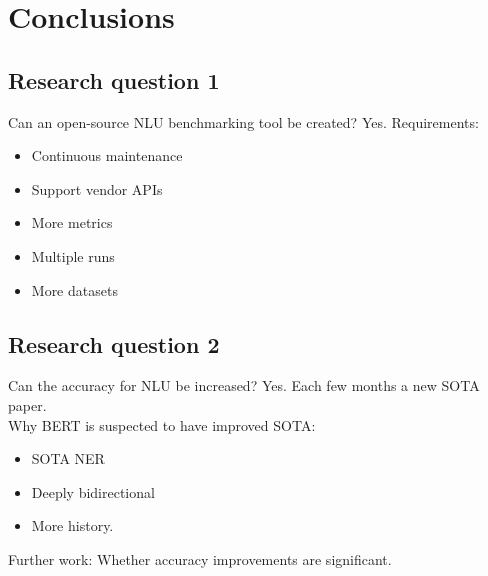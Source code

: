 \documentclass[pdf]{beamer}
\begin{document}
    \section{Conclusions}
    \subsection{Research question 1}
    \begin{frame}{Can an open-source NLU benchmarking tool be created?}
        Yes.
        Requirements:
        \begin{itemize}
            \item Continuous maintenance
            \item Support vendor APIs
            \item More metrics
            \item Multiple runs
            \item More datasets
        \end{itemize}
    \end{frame}

    \subsection{Research question 2}
    \begin{frame}{Can the accuracy for NLU be increased?}
        Yes.
        Each few months a new SOTA paper.\\[5mm]

        Why BERT is suspected to have improved SOTA:
        \begin{itemize}
            \item SOTA NER
            \item Deeply bidirectional
            \item More history.\\[5mm]
        \end{itemize}

        Further work: Whether accuracy improvements are significant.
    \end{frame}
\end{document}
